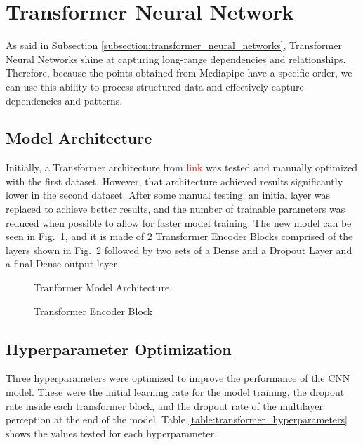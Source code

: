 \section{Transformer Neural Network}

As said in Subsection \ref{subsection:transformer_neural_networks}, Transformer Neural Networks shine at capturing long-range dependencies and relationships. Therefore, because the points obtained from Mediapipe have a specific order, we can use this ability to process structured data and effectively capture dependencies and patterns.

\subsection{Model Architecture}

Initially, a Transformer architecture from \textcolor{red}{link} was tested and manually optimized with the first dataset. However, that architecture achieved results significantly lower in the second dataset. After some manual testing, an initial layer was replaced to achieve better results, and the number of trainable parameters was reduced when possible to allow for faster model training. The new model can be seen in Fig.~\ref{fig:transformer_architecture2}, and it is made of 2 Transformer Encoder Blocks comprised of the layers shown in Fig.~\ref{fig:transformer_architecture1} followed by two sets of a Dense and a Dropout Layer and a final Dense output layer.

\begin{figure}[H]
    \centering
    {\fontsize{10}{12}\selectfont}
    \caption[Tranformer Model Architecture]{Tranformer Model Architecture}
    \label{fig:transformer_architecture2}
\end{figure}

\begin{figure}[H]
    \centering
    {\fontsize{10}{12}\selectfont}
    \caption[Transformer Encoder Block]{Transformer Encoder Block}
    \label{fig:transformer_architecture1}
\end{figure}

\subsection{Hyperparameter Optimization}

Three hyperparameters were optimized to improve the performance of the CNN model. These were the initial learning rate for the model training, the dropout rate inside each transformer block, and the dropout rate of the multilayer perception at the end of the model. Table \ref{table:transformer_hyperparameters} shows the values tested for each hyperparameter.

